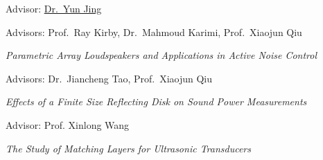 \documentclass[10pt,a4paper,ragged2e,withhyper]{altacv}
\newcommand{\hrefhl}[2]{{\color{accent}\href{#1}{#2}}}
\begin{document}

\faUserTie Advisor: \hrefhl{https://sites.psu.edu/jinglab/members/}{Dr.\ Yun Jing}

\medskip



\faUserTie Advisors: Prof.\ Ray Kirby, Dr.\ Mahmoud Karimi, Prof.\ Xiaojun Qiu

\faBook \textit{Parametric Array Loudspeakers and Applications in Active Noise Control}

\divider


\faUserTie Advisors: Dr.\ Jiancheng Tao, Prof.\ Xiaojun Qiu

\faBook \textit{Effects of a Finite Size Reflecting Disk on Sound Power Measurements}

\divider


\faUserTie Advisor: Prof. Xinlong Wang

\faBook \textit{The Study of Matching Layers for Ultrasonic Transducers}


\medskip








\end{document}
